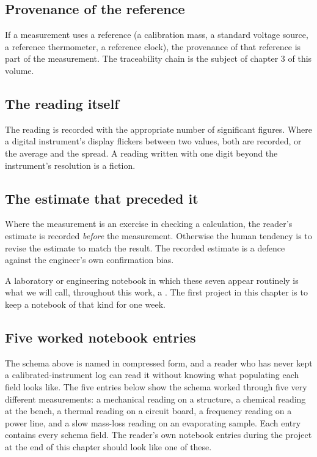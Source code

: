 \subsection{Provenance of the reference}

If a measurement uses a reference (a calibration mass, a standard
voltage source, a reference thermometer, a reference clock), the
provenance of that reference is part of the measurement. The
traceability chain is the subject of chapter 3 of this volume.

\subsection{The reading itself}

The reading is recorded with the appropriate number of significant
figures. Where a digital instrument's display flickers between two
values, both are recorded, or the average and the spread. A reading
written with one digit beyond the instrument's resolution is a
fiction.

\subsection{The estimate that preceded it}

Where the measurement is an exercise in checking a calculation, the
reader's estimate is recorded \emph{before} the measurement. Otherwise
the human tendency is to revise the estimate to match the result. The
recorded estimate is a defence against the engineer's own confirmation
bias.

A laboratory or engineering notebook in which these seven appear
routinely is what we will call, throughout this work, a . The first project in this chapter is to keep a notebook of
that kind for one week.

\subsection{Five worked notebook entries}

The schema above is named in compressed form, and a reader who has
never kept a calibrated-instrument log can read it without knowing
what populating each field looks like. The five entries below show
the schema worked through five very different measurements: a
mechanical reading on a structure, a chemical reading at the bench, a
thermal reading on a circuit board, a frequency reading on a power
line, and a slow mass-loss reading on an evaporating sample. Each
entry contains every schema field. The reader's own notebook entries
during the project at the end of this chapter should look like one of
these.

